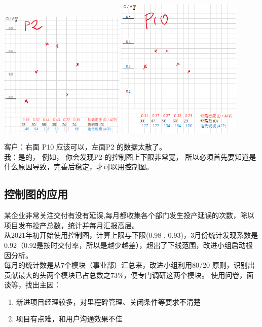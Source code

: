 \includegraphics[width=6cm]{P2CcScreenshot_2021-09-25_111304.png}
\includegraphics[width=6cm]{P10CcScreenshot_2021-09-25_104057.png}

客户：右面 P10 应该可以，左面P2 的数据太散了。\\
我：是的， 例如， 你会发现P2 的控制图上下限非常宽，
所以必须首先要知道是什么原因导致，完善后稳定，才可以用控制图。\\

\hypertarget{ux63a7ux5236ux56feux7684ux5e94ux7528}{%
\subsection{控制图的应用}\label{ux63a7ux5236ux56feux7684ux5e94ux7528}}

某企业非常关注交付有没有延误,每月都收集各个部门发生投产延误的次数，除以项目发布投产总数，统计并每月汇报高层。\\
从2021年初开始使用控制图，计算上限与下限(0.98 , 0.93)，3月份统计发现系数是0.92（0.92是按时交付率，所以是越少越差），超出了下线范围，改进小组启动根因分析。\\
每月的统计数是从7个模块（事业部）汇总来，改进小组利用80/20
原则，识别出贡献最大的头两个模块已占总数之73\%，便专门调研这两个模块。
使用问卷，面谈等，找出主因：

\begin{enumerate}
\tightlist
\item
  新进项目经理较多，对里程碑管理、关闭条件等要求不清楚
\item
  项目有点难，和用户沟通效果不佳
\end{enumerate}

